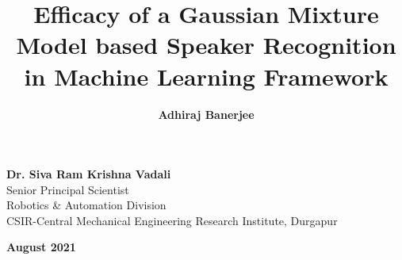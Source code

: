 \documentclass{article}
\title{\textbf{Efficacy of a Gaussian Mixture Model based Speaker Recognition in Machine Learning Framework}}
\author{\textbf{Adhiraj Banerjee}}
\begin{document}
\vspace{-3em}
\maketitle
\thispagestyle{empty}
\vspace{-3em}
\begin{center}{\textbf{Dr. Siva Ram Krishna Vadali}\\ Senior Principal Scientist \\ Robotics \& Automation Division\\ 
CSIR-Central Mechanical Engineering Research Institute, Durgapur\\}
\end{center}
\vspace{1em}
\begin{center}{\textbf{August 2021}}
\end{center}
\newpage
\tableofcontents
\newpage
\listoffigures
\newpage
\listoftables
\newpage
\end{document}
